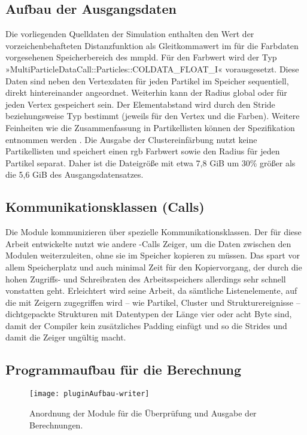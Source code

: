 \subsection*{Aufbau der Ausgangsdaten}\label{sec:pluginaufbau-mmpld}
Die vorliegenden Quelldaten der Simulation enthalten den Wert der vorzeichenbehafteten Distanzfunktion als Gleitkommawert im für die Farbdaten vorgesehenen Speicherbereich des \gls{mmpld}. Für den Farbwert wird der Typ »MultiParticleDataCall::Particles::COLDATA\_FLOAT\_I« vorausgesetzt. Diese Daten sind neben den Vertexdaten für jeden Partikel im Speicher sequentiell, direkt hintereinander angeordnet. Weiterhin kann der Radius global oder für jeden Vertex gespeichert sein. Der Elementabstand wird durch den Stride beziehungsweise Typ bestimmt (jeweils für den Vertex und die Farben). Weitere Feinheiten wie die Zusammenfassung in Partikellisten können der Spezifikation entnommen werden \cite[S.~3]{FileFormatSpecificationMMPLD}. Die Ausgabe der Clustereinfärbung nutzt keine Partikellisten und speichert einen \gls{rgb} Farbwert sowie den Radius für jeden Partikel separat. Daher ist die Dateigröße mit etwa 7,8 \gls{GiB} um 30\% größer als die 5,6 \gls{GiB} des Ausgangsdatensatzes.

\subsection*{Kommunikationsklassen (Calls)}
Die Module kommunizieren über spezielle Kommunikationsklassen. Der für diese Arbeit entwickelte  nutzt wie andere -Calls Zeiger, um die Daten zwischen den Modulen weiterzuleiten, ohne sie im Speicher kopieren zu müssen. Das spart vor allem Speicherplatz und auch minimal Zeit für den Kopiervorgang, der durch die hohen Zugriffs- und Schreibraten des Arbeitsspeichers allerdings sehr schnell vonstatten geht. Erleichtert wird seine Arbeit, da sämtliche Listenelemente, auf die mit Zeigern zugegriffen wird -- wie Partikel, Cluster und Strukturereignisse -- dichtgepackte Strukturen mit Datentypen der Länge vier oder acht Byte sind, damit der Compiler kein zusätzliches Padding einfügt und so die Strides und damit die Zeiger ungültig macht.

\subsection*{Programmaufbau für die Berechnung}\label{sec:pluginaufbau-calc}
\begin{figure}
	\texttt{[image: pluginAufbau-writer]}
	\caption{Anordnung der  Module für die Überprüfung und Ausgabe der Berechnungen.}\label{fig:pluginAufbau-writer}
\end{figure}

